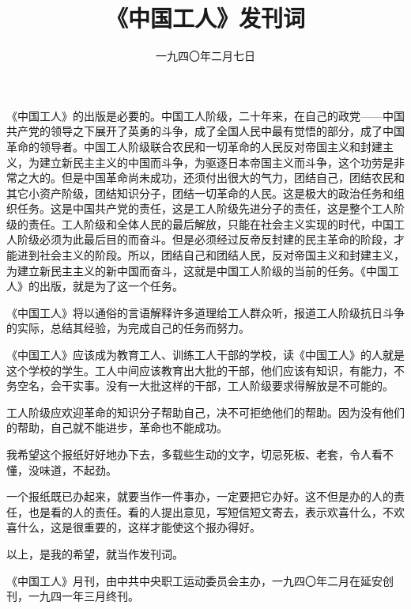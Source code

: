 
\title{《中国工人》发刊词}
\date{一九四〇年二月七日}
\maketitle


《中国工人》的出版是必要的。中国工人阶级，二十年来，在自己的政党——中国共产党的领导之下展开了英勇的斗争，成了全国人民中最有觉悟的部分，成了中国革命的领导者。中国工人阶级联合农民和一切革命的人民反对帝国主义和封建主义，为建立新民主主义的中国而斗争，为驱逐日本帝国主义而斗争，这个功劳是非常之大的。但是中国革命尚未成功，还须付出很大的气力，团结自己，团结农民和其它小资产阶级，团结知识分子，团结一切革命的人民。这是极大的政治任务和组织任务。这是中国共产党的责任，这是工人阶级先进分子的责任，这是整个工人阶级的责任。工人阶级和全体人民的最后解放，只能在社会主义实现的时代，中国工人阶级必须为此最后目的而奋斗。但是必须经过反帝反封建的民主革命的阶段，才能进到社会主义的阶段。所以，团结自己和团结人民，反对帝国主义和封建主义，为建立新民主主义的新中国而奋斗，这就是中国工人阶级的当前的任务。《中国工人》的出版，就是为了这一个任务。

《中国工人》将以通俗的言语解释许多道理给工人群众听，报道工人阶级抗日斗争的实际，总结其经验，为完成自己的任务而努力。

《中国工人》应该成为教育工人、训练工人干部的学校，读《中国工人》的人就是这个学校的学生。工人中间应该教育出大批的干部，他们应该有知识，有能力，不务空名，会干实事。没有一大批这样的干部，工人阶级要求得解放是不可能的。

工人阶级应欢迎革命的知识分子帮助自己，决不可拒绝他们的帮助。因为没有他们的帮助，自己就不能进步，革命也不能成功。

我希望这个报纸好好地办下去，多载些生动的文字，切忌死板、老套，令人看不懂，没味道，不起劲。

一个报纸既已办起来，就要当作一件事办，一定要把它办好。这不但是办的人的责任，也是看的人的责任。看的人提出意见，写短信短文寄去，表示欢喜什么，不欢喜什么，这是很重要的，这样才能使这个报办得好。

以上，是我的希望，就当作发刊词。


\begin{maonote}
《中国工人》月刊，由中共中央职工运动委员会主办，一九四〇年二月在延安创刊，一九四一年三月终刊。
\end{maonote}
